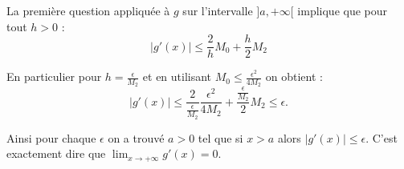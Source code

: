 {\begin{enumerate}
{La première question appliquée à $g$ sur l'intervalle $]a,+\infty[$ implique 
que pour tout $h>0$ : 
$$|g'(x)| \le  \frac{2}{h}M_0 + \frac {h}{2} M_2 $$

En particulier pour $h = \frac{\epsilon}{M_2}$ et en utilisant $M_0  \le \frac{\epsilon^2}{4M_2}$
on obtient :
$$|g'(x)| \le  \frac{2}{\frac{\epsilon}{M_2}}\frac{\epsilon^2}{4M_2} + \frac{\frac{\epsilon}{M_2}}{2} M_2 \le \epsilon.$$

Ainsi pour chaque $\epsilon$ on a trouvé $a>0$ tel que si $x>a$ alors $|g'(x)|\le \epsilon$.
C'est exactement dire que $\lim_{x\to+\infty} g'(x)=0$.}
\end{enumerate}
}
